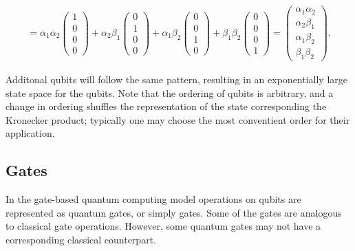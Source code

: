 \documentclass{article}
\begin{document}
\begin{multline}
= \alpha_1 \alpha_2        \begin{pmatrix}1\\0\\0\\0\end{pmatrix} 
+ \alpha_2 \beta_1           \begin{pmatrix}0\\1\\0\\0\end{pmatrix} 
+ \alpha_1 \beta_2            \begin{pmatrix}0\\0\\1\\0\end{pmatrix} 
+ \beta_1 \beta_2               \begin{pmatrix}0\\0\\0\\1\end{pmatrix} 
= \begin{pmatrix} \alpha_1 \alpha_2 \\  \alpha_2 \beta_1  \\  \alpha_1 \beta_2 \\  \beta_1 \beta_2 \end{pmatrix} 
 .
\end{multline}


Additonal qubits will follow the same pattern, resulting in an exponentially large state space for the qubits. Note that the ordering of qubits is arbitrary, and a change in ordering shuffles the representation of the state corresponding the Kronecker product; typically one may choose the most conventient order for their application.


%






\subsection{Gates}

In the gate-based quantum computing model operations on qubits are represented as quantum gates, or simply gates. Some of the gates are analogous to classical gate operations. However, some quantum gates may not have a corresponding classical counterpart.
\end{document}
